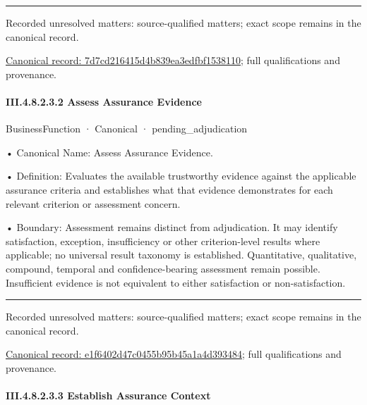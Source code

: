 \medskip\hrule\medskip

{\small Recorded unresolved matters: source-qualified matters; exact scope remains in the canonical record.}\par
{\footnotesize \href{../../../../../../../continuum/business/business-function/7d7cd216415d4b839ea3edfbf1538110.md}{Canonical record: 7d7cd216415d4b839ea3edfbf1538110}; full qualifications and provenance.}\par
\paragraph*{III.4.8.2.3.2 Assess Assurance Evidence}
\label{navigation:III.4.8.2.3.2}

\label{element:e1f6402d47c0455b95b45a1a4d393484}
{\small BusinessFunction · Canonical · pending\_adjudication}\par

•
Canonical Name: Assess Assurance Evidence.



•
Definition: Evaluates the available trustworthy evidence against the applicable assurance criteria and establishes what that evidence demonstrates for each relevant criterion or assessment concern.



•
Boundary: Assessment remains distinct from adjudication. It may identify satisfaction, exception, insufficiency or other criterion-level results where applicable; no universal result taxonomy is established. Quantitative, qualitative, compound, temporal and confidence-bearing assessment remain possible. Insufficient evidence is not equivalent to either satisfaction or non-satisfaction.



\medskip\hrule\medskip

{\small Recorded unresolved matters: source-qualified matters; exact scope remains in the canonical record.}\par
{\footnotesize \href{../../../../../../../continuum/business/business-function/e1f6402d47c0455b95b45a1a4d393484.md}{Canonical record: e1f6402d47c0455b95b45a1a4d393484}; full qualifications and provenance.}\par
\paragraph*{III.4.8.2.3.3 Establish Assurance Context}
\label{navigation:III.4.8.2.3.3}

